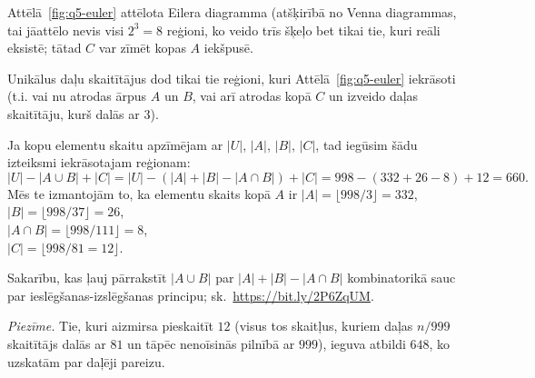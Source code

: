 \documentclass[a4paper,12pt]{article}
\begin{document}
\begin{problem}
{Attēlā~\ref{fig:q5-euler} attēlota Eilera diagramma (atšķirībā no Venna diagrammas, tai jāattēlo nevis visi $2^3 = 8$ 
reģioni, ko veido trīs šķeļo bet tikai tie, kuri reāli eksistē; tātad $C$ var zīmēt kopas $A$ iekšpusē.

Unikālus daļu skaitītājus dod tikai tie reģioni, kuri Attēlā~\ref{fig:q5-euler} iekrāsoti (t.i. vai nu 
atrodas ārpus $A$ un $B$, vai arī atrodas kopā $C$ un izveido daļas skaitītāju, kurš dalās ar $3$). 

Ja kopu elementu skaitu apzīmējam ar $|U|$, $|A|$, $|B|$, $|C|$, tad iegūsim šādu izteiksmi iekrāsotajam reģionam: 
\[ |U| - |A \cup B| + |C| = |U| - (|A| + |B| - |A \cap B|) + |C| = 998 - (332 + 26 - 8) + 12 = 660. \]
Mēs te izmantojām to, ka elementu skaits kopā $A$ ir $|A| = \lfloor 998/3 \rfloor = 332$,\\
$|B| = \lfloor 998/37 \rfloor = 26$,\\
$|A \cap B| = \lfloor 998/111 \rfloor = 8$,\\
$|C| = \lfloor 998/81 = 12 \rfloor$.

Sakarību, kas ļauj pārrakstīt $|A \cup B|$ par $|A| + |B| - |A \cap B|$ kombinatorikā sauc 
par ieslēgšanas-izslēgšanas principu; sk.\ \url{https://bit.ly/2P6ZqUM}.

{\em Piezīme.} Tie, kuri aizmirsa pieskaitīt $12$ (visus tos skaitļus, kuriem daļas $n/999$ skaitītājs dalās
ar $81$ un tāpēc nenoīsinās pilnībā ar $999$), ieguva atbildi $648$, ko uzskatām par daļēji pareizu.
}
\end{problem}
\end{document}
